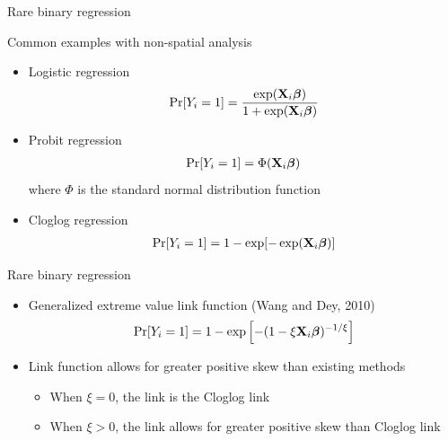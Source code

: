 \documentclass{beamer}
\begin{document}
\begin{frame}{Rare binary regression}
\begin{adjustwidth}{1em}{0em}
  Common examples with non-spatial analysis \vspace{1em}
  \begin{itemize} \setlength{\itemsep}{1em}
    \item Logistic regression
    \begin{align*}
      \Pr[Y_i = 1] = \frac{ \exp(\mbox{\bf X}_i \mbox{\boldmath $\beta$}) }{ 1 + \exp(\mbox{\bf X}_i \mbox{\boldmath $\beta$})}
    \end{align*}
    \item Probit regression
    \begin{align*}
      \Pr[Y_i = 1] = \Phi(\mbox{\bf X}_i \mbox{\boldmath $\beta$})
    \end{align*}
    where $\Phi$ is the standard normal distribution function
    \item Cloglog regression
    \begin{align*}
      \Pr[Y_i = 1] = 1 - \exp[ -\exp(\mbox{\bf X}_i \mbox{\boldmath $\beta$})]
    \end{align*}
  \end{itemize}
\end{adjustwidth}
\end{frame}

\begin{frame}{Rare binary regression}
  \begin{itemize} \setlength{\itemsep}{1em}
    \item Generalized extreme value link function (Wang and Dey, 2010)
    \begin{align*}
      \Pr[Y_i = 1] = 1 - \exp\left[-(1 - \xi \mbox{\bf X}_i \mbox{\boldmath $\beta$})^{-1 / \xi} \right]
    \end{align*}
    \item Link function allows for greater positive skew than existing methods \vspace{0.5em}
    \begin{itemize} \setlength{\itemsep}{0.5em}
      \item When $\xi = 0$, the link is the Cloglog link
      \item When $\xi > 0$, the link allows for greater positive skew than Cloglog link
    \end{itemize}
  \end{itemize}
\end{frame}
\end{document}
